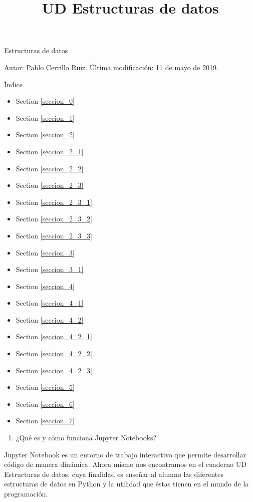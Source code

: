 \documentclass[11pt]{article}
\title{UD Estructuras de datos}
\providecommand{\tightlist}{%
      \setlength{\itemsep}{0pt}\setlength{\parskip}{0pt}}
\begin{document}
    
    
    \maketitle
    
    

    
    Estructuras de datos

    Autor: Pablo Cerrillo Ruiz. Última modificación: 11 de mayo de 2019.

    Índice

    \begin{itemize}
\tightlist
\item
  Section \ref{seccion_0}
\item
  Section \ref{seccion_1}
\item
  Section \ref{seccion_2}
\item
  Section \ref{seccion_2_1}
\item
  Section \ref{seccion_2_2}
\item
  Section \ref{seccion_2_3}
\item
  Section \ref{seccion_2_3_1}
\item
  Section \ref{seccion_2_3_2}
\item
  Section \ref{seccion_2_3_3}
\item
  Section \ref{seccion_3}
\item
  Section \ref{seccion_3_1}
\item
  Section \ref{seccion_4}
\item
  Section \ref{seccion_4_1}
\item
  Section \ref{seccion_4_2}
\item
  Section \ref{seccion_4_2_1}
\item
  Section \ref{seccion_4_2_2}
\item
  Section \ref{seccion_4_2_3}
\item
  Section \ref{seccion_5}
\item
  Section \ref{seccion_6}
\item
  Section \ref{seccion_7}
\end{itemize}

    \begin{enumerate}
\def\labelenumi{\arabic{enumi}.}
\setcounter{enumi}{-1}
\tightlist
\item
  ¿Qué es y cómo funciona Jupyter Notebooks?
\end{enumerate}

    Jupyter Notebook es un entorno de trabajo interactivo que permite
desarrollar código de manera dinámica. Ahora mismo nos encontramos en el
cuaderno UD Estructuras de datos, cuya finalidad es enseñar al alumno
las diferentes estructuras de datos en Python y la utilidad que éstas
tienen en el mundo de la programación.
\end{document}
